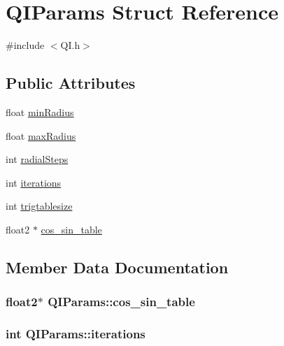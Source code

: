 \hypertarget{struct_q_i_params}{}\section{Q\+I\+Params Struct Reference}
\label{struct_q_i_params}


{\ttfamily \#include $<$Q\+I.\+h$>$}

\subsection*{Public Attributes}
\begin{DoxyCompactItemize}
\item 
float \hyperlink{struct_q_i_params_a4c3b954348ae3ee381eab69122983515}{min\+Radius}
\item 
float \hyperlink{struct_q_i_params_a59a4abd887cfec3392bb5ecd6891d7d6}{max\+Radius}
\item 
int \hyperlink{struct_q_i_params_a19b7d550113364de4e4f11e2c9cfea0e}{radial\+Steps}
\item 
int \hyperlink{struct_q_i_params_a233d13629ccc9d8c2c500286b13eeb97}{iterations}
\item 
int \hyperlink{struct_q_i_params_a2078879365690b162cac67e45837a29d}{trigtablesize}
\item 
float2 $\ast$ \hyperlink{struct_q_i_params_a8da3ccdd4b94c119a0d63ff63f28b8e7}{cos\+\_\+sin\+\_\+table}
\end{DoxyCompactItemize}


\subsection{Member Data Documentation}
\subsubsection[{\texorpdfstring{cos\+\_\+sin\+\_\+table}{cos_sin_table}}]{\setlength{\rightskip}{0pt plus 5cm}float2$\ast$ Q\+I\+Params\+::cos\+\_\+sin\+\_\+table}\hypertarget{struct_q_i_params_a8da3ccdd4b94c119a0d63ff63f28b8e7}{}\label{struct_q_i_params_a8da3ccdd4b94c119a0d63ff63f28b8e7}
\subsubsection[{\texorpdfstring{iterations}{iterations}}]{\setlength{\rightskip}{0pt plus 5cm}int Q\+I\+Params\+::iterations}\hypertarget{struct_q_i_params_a233d13629ccc9d8c2c500286b13eeb97}{}\label{struct_q_i_params_a233d13629ccc9d8c2c500286b13eeb97}
